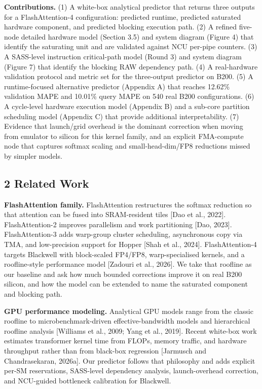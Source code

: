 \documentclass[
  10pt,journal,compsoc,twoside]{IEEEtran}
\begin{document}
\textbf{Contributions.} (1) A white-box analytical predictor that
returns three outputs for a FlashAttention-4 configuration: predicted
runtime, predicted saturated hardware component, and predicted blocking
execution path. (2) A refined five-node detailed hardware model (Section
3.5) and system diagram (Figure 4) that identify the saturating unit and
are validated against NCU per-pipe counters. (3) A SASS-level
instruction critical-path model (Round 3) and system diagram (Figure 7)
that identify the blocking RAW dependency path. (4) A real-hardware
validation protocol and metric set for the three-output predictor on
B200. (5) A runtime-focused alternative predictor (Appendix A) that
reaches 12.62\% validation MAPE and 10.01\% query MAPE on 540 real B200
configurations. (6) A cycle-level hardware execution model (Appendix B)
and a sub-core partition scheduling model (Appendix C) that provide
additional interpretability. (7) Evidence that launch/grid overhead is
the dominant correction when moving from emulator to silicon for this
kernel family, and an explicit FMA-compute node that captures softmax
scaling and small-head-dim/FP8 reductions missed by simpler models.

\subsection{2 Related Work}\label{related-work}

\textbf{FlashAttention family.} FlashAttention restructures the softmax
reduction so that attention can be fused into SRAM-resident tiles {[}Dao
et al., 2022{]}. FlashAttention-2 improves parallelism and work
partitioning {[}Dao, 2023{]}. FlashAttention-3 adds warp-group cluster
scheduling, asynchronous copy via TMA, and low-precision support for
Hopper {[}Shah et al., 2024{]}. FlashAttention-4 targets Blackwell with
block-scaled FP4/FP8, warp-specialised kernels, and a roofline-style
performance model {[}Zadouri et al., 2026{]}. We take that roofline as
our baseline and ask how much bounded corrections improve it on real
B200 silicon, and how the model can be extended to name the saturated
component and blocking path.

\textbf{GPU performance modeling.} Analytical GPU models range from the
classic roofline to microbenchmark-driven effective-bandwidth models and
hierarchical roofline analysis {[}Williams et al., 2009; Yang et al.,
2019{]}. Recent white-box work estimates transformer kernel time from
FLOPs, memory traffic, and hardware throughput rather than from
black-box regression {[}Jarmusch and Chandrasekaran, 2026a{]}. Our
predictor follows that philosophy and adds explicit per-SM reservations,
SASS-level dependency analysis, launch-overhead correction, and
NCU-guided bottleneck calibration for Blackwell.
\end{document}
